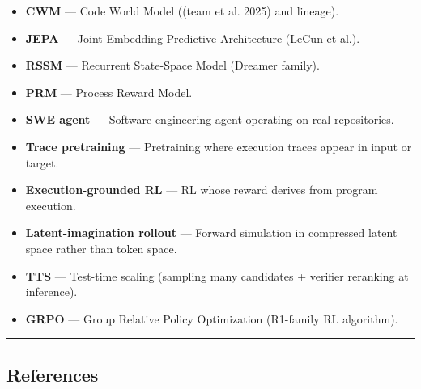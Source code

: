 \documentclass{article}
\providecommand{\tightlist}{\setlength{\itemsep}{0pt}\setlength{\parskip}{0pt}}
\begin{document}
\begin{itemize}
\tightlist
\item
  \textbf{CWM} --- Code World Model ((team et al. 2025) and lineage).
\item
  \textbf{JEPA} --- Joint Embedding Predictive Architecture (LeCun et
  al.).
\item
  \textbf{RSSM} --- Recurrent State-Space Model (Dreamer family).
\item
  \textbf{PRM} --- Process Reward Model.
\item
  \textbf{SWE agent} --- Software-engineering agent operating on real
  repositories.
\item
  \textbf{Trace pretraining} --- Pretraining where execution traces
  appear in input or target.
\item
  \textbf{Execution-grounded RL} --- RL whose reward derives from
  program execution.
\item
  \textbf{Latent-imagination rollout} --- Forward simulation in
  compressed latent space rather than token space.
\item
  \textbf{TTS} --- Test-time scaling (sampling many candidates +
  verifier reranking at inference).
\item
  \textbf{GRPO} --- Group Relative Policy Optimization (R1-family RL
  algorithm).
\end{itemize}

\begin{center}\rule{0.5\linewidth}{0.5pt}\end{center}

\hypertarget{references}{%
\subsection*{References}\label{references}}
\end{document}
